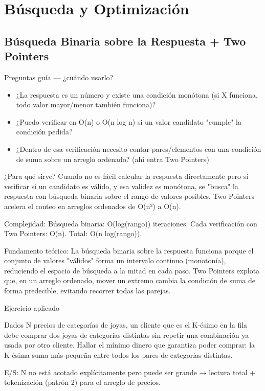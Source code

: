 \section{Búsqueda y Optimización}

\subsection{Búsqueda Binaria sobre la Respuesta + Two Pointers}

Preguntas guía — ¿cuándo usarlo?

\begin{itemize}
\item ¿La respuesta es un número y existe una condición monótona (si X funciona, todo valor mayor/menor también funciona)?
\item ¿Puedo verificar en O(n) o O(n log n) si un valor candidato "cumple" la condición pedida?
\item ¿Dentro de esa verificación necesito contar pares/elementos con una condición de suma sobre un arreglo ordenado? (ahí entra Two Pointers)
\end{itemize}

¿Para qué sirve? Cuando no es fácil calcular la respuesta directamente pero sí verificar si un candidato es válido, y esa validez es monótona, se "busca" la respuesta con búsqueda binaria sobre el rango de valores posibles. Two Pointers acelera el conteo en arreglos ordenados de O(n²) a O(n).

Complejidad: Búsqueda binaria: O(log(rango)) iteraciones. Cada verificación con Two Pointers: O(n). Total: O(n log(rango)).

Fundamento teórico: La búsqueda binaria sobre la respuesta funciona porque el conjunto de valores "válidos" forma un intervalo continuo (monotonía), reduciendo el espacio de búsqueda a la mitad en cada paso. Two Pointers explota que, en un arreglo ordenado, mover un extremo cambia la condición de suma de forma predecible, evitando recorrer todas las parejas.

Ejercicio aplicado

Dados N precios de categorías de joyas, un cliente que es el K-ésimo en la fila debe comprar dos joyas de categorías distintas sin repetir una combinación ya usada por otro cliente. Hallar el mínimo dinero que garantiza poder comprar: la K-ésima suma más pequeña entre todos los pares de categorías distintas.

E/S: N no está acotado explícitamente pero puede ser grande → lectura total + tokenización (patrón 2) para el arreglo de precios.

